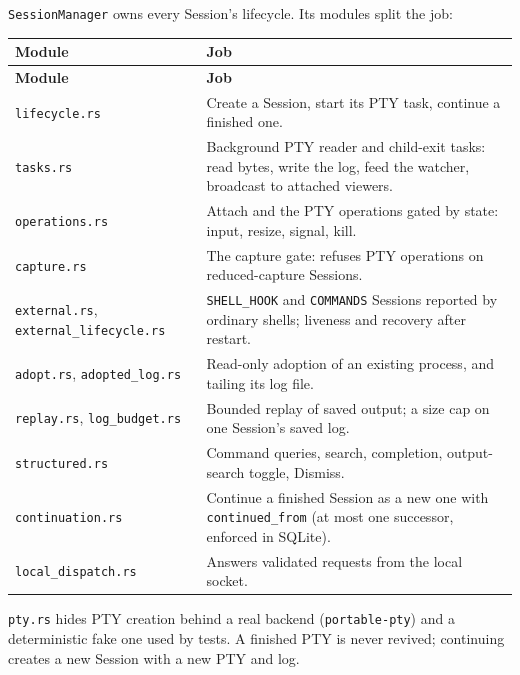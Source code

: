\texttt{SessionManager} owns every Session's lifecycle. Its modules split the job:

\begin{small}
\begin{longtable}{>{\raggedright\arraybackslash}p{0.334\dimexpr \linewidth-4\tabcolsep\relax}>{\raggedright\arraybackslash}p{0.666\dimexpr \linewidth-4\tabcolsep\relax}}
\toprule
\textbf{Module} & \textbf{Job} \\
\midrule
\endfirsthead
\toprule
\textbf{Module} & \textbf{Job} \\
\midrule
\endhead
\texttt{lifecycle.\allowbreak{}rs} & Create a Session, start its PTY task, continue a finished one. \\
\texttt{tasks.\allowbreak{}rs} & Background PTY reader and child-exit tasks: read bytes, write the log, feed the watcher, broadcast to attached viewers. \\
\texttt{operations.\allowbreak{}rs} & Attach and the PTY operations gated by state: input, resize, signal, kill. \\
\texttt{capture.\allowbreak{}rs} & The capture gate: refuses PTY operations on reduced-capture Sessions. \\
\texttt{external.\allowbreak{}rs}, \texttt{external\_\allowbreak{}lifecycle.\allowbreak{}rs} & \texttt{SHELL\_\allowbreak{}HOOK} and \texttt{COMMANDS} Sessions reported by ordinary shells; liveness and recovery after restart. \\
\texttt{adopt.\allowbreak{}rs}, \texttt{adopted\_\allowbreak{}log.\allowbreak{}rs} & Read-only adoption of an existing process, and tailing its log file. \\
\texttt{replay.\allowbreak{}rs}, \texttt{log\_\allowbreak{}budget.\allowbreak{}rs} & Bounded replay of saved output; a size cap on one Session's saved log. \\
\texttt{structured.\allowbreak{}rs} & Command queries, search, completion, output-search toggle, Dismiss. \\
\texttt{continuation.\allowbreak{}rs} & Continue a finished Session as a new one with \texttt{continued\_\allowbreak{}from} (at most one successor, enforced in SQLite). \\
\texttt{local\_\allowbreak{}dispatch.\allowbreak{}rs} & Answers validated requests from the local socket. \\
\bottomrule
\end{longtable}
\end{small}

\texttt{pty.\allowbreak{}rs} hides PTY creation behind a real backend (\texttt{portable-{}\allowbreak{}pty}) and a deterministic fake one used by tests. A finished PTY is never revived; continuing creates a new Session with a new PTY and log.

